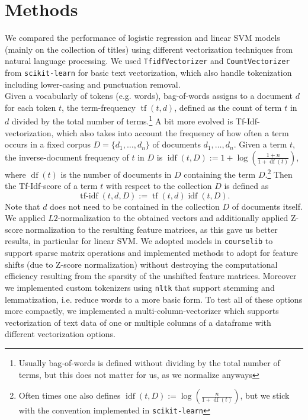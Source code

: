 \documentclass[10pt]{article}
\begin{document}
	\section{Methods}
	We compared the performance of logistic regression and linear SVM models (mainly on the collection of titles) using different vectorization techniques from natural language processing. 
	We used \texttt{TfidfVectorizer} and \texttt{CountVectorizer} from \texttt{scikit-learn} for basic text vectorization, which also handle tokenization including lower-casing and punctuation removal.\\
	Given a vocabularly of tokens (e.g. words), bag-of-words assigns to a document $d$ for each token $t$, the term-frequency $\operatorname{tf}(t,d)$, defined as the count of term $t$ in $d$ divided by the total number of terms.\footnote{Usually bag-of-words is defined without dividing by the total number of terms, but this does not matter for us, as we normalize anyways}
	 A bit more evolved is Tf-Idf-vectorization, which also takes into account the frequency of how often a term occurs in a fixed corpus $D=\{d_1, \dots, d_n\}$ of documents $d_1, \dots, d_n$. Given a term $t$, the inverse-document frequency of $t$ in $D$ is $\operatorname{idf}(t,D):=1+\log\left(\frac{1+n}{1+\operatorname{df}(t)}\right)$, where $\operatorname{df}(t)$ is the number of documents in $D$ containing the term $D$.\footnote{Often times one also defines  $\operatorname{idf}(t,D):=\log\left(\frac{n}{1+\operatorname{df}(t)}\right)$, but we stick with the convention implemented in \texttt{scikit-learn}} Then the Tf-Idf-score of a term $t$ with respect to the collection $D$ is defined as \[\operatorname{tf-idf}(t,d,D):=\operatorname{tf}(t,d)\operatorname{idf}(t,D).\]
	Note that $d$ does not need to be contained in the collection $D$ of documents itself. We applied $L2$-normalization to the obtained vectors and additionally applied Z-score normalization to the resulting feature matrices, as this gave us better results, in particular for linear SVM. 
	We adopted models in \texttt{courselib} to support sparse matrix operations and implemented methods to adopt for feature shifts (due to Z-score normalization) without destroying the computational efficiency resulting from the sparsity of the unshifted feature matrices. Moreover we implemented custom tokenizers using \texttt{nltk} that support stemming and lemmatization, i.e. reduce words to a more basic form. To test all of these options more compactly, we implemented a multi-column-vectorizer which supports vectorization of text data of one or multiple columns of a dataframe with different vectorization options.
\end{document}
